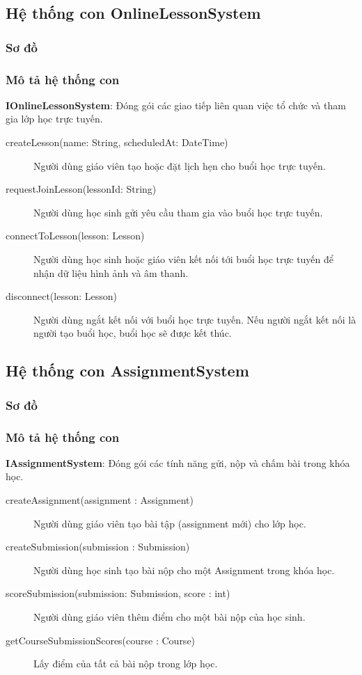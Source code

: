 \documentclass[./../main_file.tex]{subfiles}
\begin{document}
	\subsection{Hệ thống con OnlineLessonSystem}
		\subsubsection{Sơ đồ}
		\begin{figure}[H]
			
		\end{figure}
		\subsubsection{Mô tả hệ thống con}
		\textbf{IOnlineLessonSystem}: Đóng gói các giao tiếp liên quan việc tổ chức và tham gia lớp học trực tuyến.
		\begin{description}
			\item[createLesson(name: String, scheduledAt: DateTime)] Người dùng giáo viên tạo hoặc đặt lịch hẹn cho buổi học trực tuyến.
			\item[requestJoinLesson(lessonId: String)] Người dùng học sinh gửi yêu cầu tham gia vào buổi học trực tuyến.
			\item[connectToLesson(lesson: Lesson)] Người dùng học sinh hoặc giáo viên kết nối tới buổi học trực tuyến để nhận dữ liệu hình ảnh và âm thanh.
			\item[disconnect(lesson: Lesson)] Người dùng ngắt kết nối với buổi học trực tuyến. Nếu người ngắt kết nối là người tạo buổi học, buổi học sẽ được kết thúc.
		\end{description}
		
	\subsection{Hệ thống con AssignmentSystem}
		\subsubsection{Sơ đồ}
		\subsubsection{Mô tả hệ thống con}
		\textbf{IAssignmentSystem}: Đóng gói các tính năng gửi, nộp và chấm bài trong khóa học.
		\begin{description}
			\item[createAssignment(assignment : Assignment)] Người dùng giáo viên tạo bài tập (assignment mới) cho lớp học.
			\item[createSubmission(submission : Submission)] Người dùng học sinh tạo bài nộp cho một Assignment trong khóa học.
			\item[scoreSubmission(submission: Submission, score : int)] Người dùng giáo viên thêm điểm cho một bài nộp của học sinh.
			\item[getCourseSubmissionScores(course : Course)] Lấy điểm của tất cả bài nộp trong lớp học.
		\end{description}
		
\end{document}
